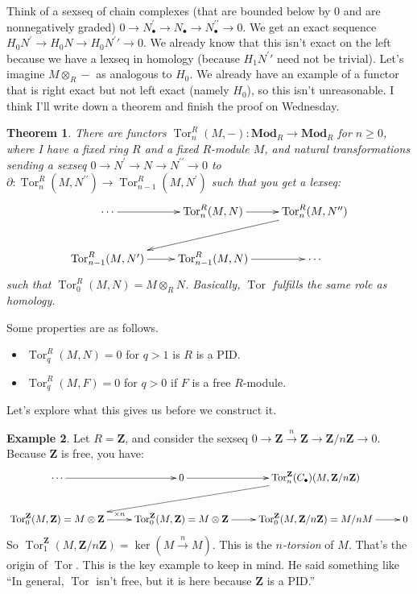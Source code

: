 \documentclass{amsart}
\theoremstyle{theorem}
\newtheorem{theorem}{Theorem}[section]
\theoremstyle{definition}
\newtheorem{example}[theorem]{Example}
\DeclareMathOperator{\Tor}{Tor}
\newcommand{\Z}{\mathbf Z}
\begin{document}
Think of a sexseq of chain complexes (that are bounded below by $0$ and are nonnegatively graded) $0\to N^\prime_\bullet\to N_\bullet\to N^{\prime\prime}_\bullet\to 0$. We get an exact sequence $ H_0 N^\prime\to H_0 N\to H_0 N^\prime\prime\to 0$. We already know that this isn't exact on the left because we have a lexseq in homology (because $ H_1 N^\prime\prime$ need not be trivial). Let's imagine $M\otimes_R-$ as analogous to $ H_0$. We already have an example of a functor that is right exact but not left exact (namely $ H_0$), so this isn't unreasonable. I think I'll write down a theorem and finish the proof on Wednesday.
\begin{theorem}
There are functors $\Tor^R_n(M,-):\mathbf{Mod}_R\to\mathbf{Mod}_R$ for $n\geq 0$, where I have a fixed ring $R$ and a fixed $R$-module $M$, and natural transformations sending a sexseq $0\to N^\prime\to N\to N^{\prime\prime}\to 0$ to $\partial:\Tor^R_n(M,N^{\prime\prime})\to \Tor^R_{n-1}(M,N^\prime)$ such that you get a lexseq:
\begin{equation*}
\xymatrix{\cdots\ar[r] & \Tor^R_n(M,N)\ar[r] & \Tor^R_n(M,N^{\prime\prime})\ar[dll]\\
\Tor^R_{n-1}(M,N^\prime)\ar[r] & \Tor^R_{n-1}(M,N)\ar[r] & \cdots}
\end{equation*}
such that $\Tor^R_0(M,N)=M\otimes_R N$. Basically, $\Tor$ fulfills the same role as homology.
\end{theorem}
Some properties are as follows.
\begin{itemize}
\item $\Tor^R_q(M,N)=0$ for $q>1$ is $R$ is a PID.
\item $\Tor^R_q(M,F)=0$ for $q>0$ if $F$ is a free $R$-module.
\end{itemize}
Let's explore what this gives us before we construct it.
\begin{example}
Let $R=\Z$, and consider the sexseq $0\to \Z\xrightarrow{n}\Z\to\Z/n\Z\to 0$. Because $\Z$ is free, you have:
\begin{equation*}
\xymatrix{\cdots\ar[r] & 0\ar[r] & \Tor^\Z_n(C_\bullet)(M,\Z/n\Z)\ar[dll]\\
\Tor^\Z_{0}(M,\Z)=M\otimes\Z\ar[r]^{\times n} & \Tor^\Z_{0}(M,\Z)=M\otimes\Z\ar[r] & \Tor^\Z_0(M,\Z/n\Z)=M/nM\ar[r] & 0}
\end{equation*}
So $\Tor^\Z_1(M,\Z/n\Z)=\ker(M\xrightarrow{n}M)$. This is the \emph{$n$-torsion} of $M$. That's the origin of $\Tor$. This is the key example to keep in mind. He said something like ``In general, $\Tor$ isn't free, but it is here because $\Z$ is a PID.''
\end{example}
\end{document}
